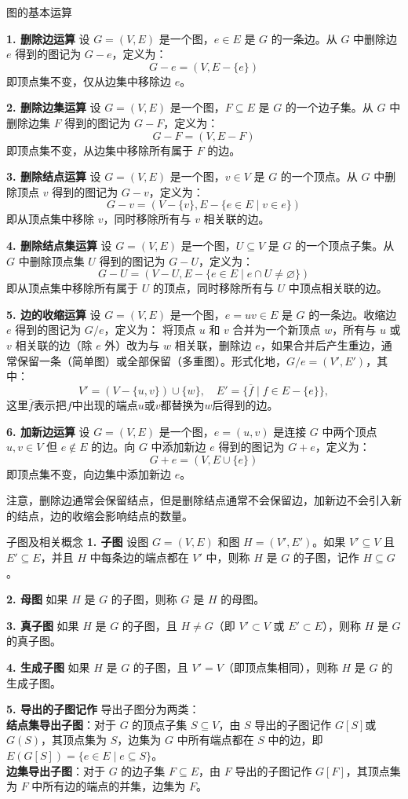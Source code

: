 \documentclass[lang=cn,11pt]{elegantbook}
\begin{document}
\begin{definition}{图的基本运算}

\textbf{1. 删除边运算}
设 $G = (V, E)$ 是一个图，$e \in E$ 是 $G$ 的一条边。从 $G$ 中删除边 $e$ 得到的图记为 $G - e$，定义为：
\[
G - e = (V, E - \{e\})
\]
即顶点集不变，仅从边集中移除边 $e$。

\textbf{2. 删除边集运算}
设 $G = (V, E)$ 是一个图，$F \subseteq E$ 是 $G$ 的一个边子集。从 $G$ 中删除边集 $F$ 得到的图记为 $G - F$，定义为：
\[
G - F = (V, E- F)
\]
即顶点集不变，从边集中移除所有属于 $F$ 的边。

\textbf{3. 删除结点运算}
设 $G = (V, E)$ 是一个图，$v \in V$ 是 $G$ 的一个顶点。从 $G$ 中删除顶点 $v$ 得到的图记为 $G - v$，定义为：
\[
G - v = (V - \{v\}, E-\{e \in E \mid v \in e\})
\]
即从顶点集中移除 $v$，同时移除所有与 $v$ 相关联的边。

\textbf{4. 删除结点集运算}
设 $G = (V, E)$ 是一个图，$U \subseteq V$ 是 $G$ 的一个顶点子集。从 $G$ 中删除顶点集 $U$ 得到的图记为 $G - U$，定义为：
\[
G - U = (V - U, E - \{e \in E \mid e \cap U \neq \varnothing\})
\]
即从顶点集中移除所有属于 $U$ 的顶点，同时移除所有与 $U$ 中顶点相关联的边。

\textbf{5. 边的收缩运算}
设 $G = (V, E)$ 是一个图，$e = uv \in E$ 是 $G$ 的一条边。收缩边 $e$ 得到的图记为 $G/e$，定义为：
将顶点 $u$ 和 $v$ 合并为一个新顶点 $w$，所有与 $u$ 或 $v$ 相关联的边（除 $e$ 外）改为与 $w$ 相关联，删除边 $e$，如果合并后产生重边，通常保留一条（简单图）或全部保留（多重图）。形式化地，$G/e = (V', E')$，其中：
\[
V' = (V - \{u, v\}) \cup \{w\}, \quad
E' = \{\overline{f}\mid f\in E-\{e\}\},
\]
这里$\overline{f}$表示把$f$中出现的端点$u$或$v$都替换为$w$后得到的边。

\textbf{6. 加新边运算}
设 $G = (V, E)$ 是一个图，$e = (u,v)$ 是连接 $G$ 中两个顶点 $u, v \in V$ 但 $e \notin E$ 的边。向 $G$ 中添加新边 $e$ 得到的图记为 $G + e$，定义为：
\[
G + e = (V, E \cup \{e\})
\]
即顶点集不变，向边集中添加新边 $e$。
\end{definition}
注意，删除边通常会保留结点，但是删除结点通常不会保留边，加新边不会引入新的结点，边的收缩会影响结点的数量。
\begin{definition}{子图及相关概念}
\textbf{1. 子图}
设图 $G = (V, E)$ 和图 $H = (V', E')$。如果 $V' \subseteq V$ 且 $E' \subseteq E$，并且 $H$ 中每条边的端点都在 $V'$ 中，则称 $H$ 是 $G$ 的子图，记作 $H \subseteq G$。

\textbf{2. 母图}
如果 $H$ 是 $G$ 的子图，则称 $G$ 是 $H$ 的母图。

\textbf{3. 真子图}
如果 $H$ 是 $G$ 的子图，且 $H \neq G$（即 $V' \subset V$ 或 $E' \subset E$），则称 $H$ 是 $G$ 的真子图。

\textbf{4. 生成子图}
如果 $H$ 是 $G$ 的子图，且 $V' = V$（即顶点集相同），则称 $H$ 是 $G$ 的生成子图。

\textbf{5. 导出的子图记作}
导出子图分为两类：\\
\textbf{结点集导出子图}：对于 $G$ 的顶点子集 $S \subseteq V$，由 $S$ 导出的子图记作 $G[S]$或$G(S)$，其顶点集为 $S$，边集为 $G$ 中所有端点都在 $S$ 中的边，即 $E(G[S]) = \{ e \in E \mid e \subseteq S \}$。\\
\textbf{边集导出子图}：对于 $G$ 的边子集 $F \subseteq E$，由 $F$ 导出的子图记作 $G[F]$，其顶点集为 $F$ 中所有边的端点的并集，边集为 $F$。
\end{definition}
\end{document}
